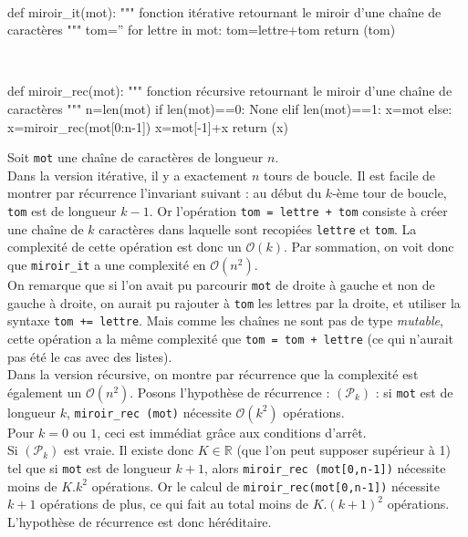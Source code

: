 \begin{corrige}
\question\ 
\begin{python}
def miroir_it(mot):
    """ fonction itérative retournant 
    le miroir d'une chaîne de caractères """
    tom=''
    for lettre in mot:
        tom=lettre+tom
    return (tom)
\end{python}

\question\ 
\begin{python}
def miroir_rec(mot):
    """ fonction récursive retournant 
    le miroir d'une chaîne de caractères """
    n=len(mot)
    if len(mot)==0:
        None
    elif len(mot)==1:
        x=mot
    else:
        x=miroir_rec(mot[0:n-1])
        x=mot[-1]+x
    return (x)
\end{python}

\setcounter{question}{3}
\question
Soit \texttt{mot} une chaîne de caractères de longueur $n$.\\
Dans la version itérative, il y a exactement $n$ tours de boucle. Il est facile de montrer par récurrence 
l'invariant suivant : au début du $k$-ème tour de boucle, \texttt{tom} est de longueur $k-1$. Or l'opération 
\texttt{tom = lettre + tom} consiste à créer une chaîne de $k$ caractères dans laquelle sont recopiées \texttt{lettre} 
et \texttt{tom}. La complexité de cette opération est donc un $\mathcal O(k)$. Par sommation, on voit donc que 
\texttt{miroir\_it} a une complexité en $\mathcal O(n^2)$.\\
On remarque que si l'on avait pu parcourir \texttt{mot} de droite à gauche et non de gauche à droite, on aurait pu 
rajouter à \texttt{tom} les lettres par la droite, et utiliser la syntaxe \texttt{tom += lettre}. Mais comme les 
chaînes ne sont pas de type \textit{mutable}, cette opération a la même complexité que \texttt{tom = tom + lettre} (ce 
qui n'aurait pas été le cas avec des listes).\\
Dans la version récursive, on montre par récurrence que la complexité est également un $\mathcal O(n^2)$. Posons 
l'hypothèse de 
récurrence : $(\mathcal P _k)$ : si \texttt{mot} est de longueur $k$, \texttt{miroir\_rec (mot)} nécessite $\mathcal 
O(k^2)$ 
opérations.\\
Pour $k=0$ ou $1$, ceci est immédiat grâce aux conditions d'arrêt.\\
Si $(\mathcal P _k)$ est vraie. Il existe donc $K\in\mathbb R$ (que l'on peut supposer supérieur à 1) tel que si 
\texttt{mot} est de longueur $k+1$, alors \texttt{miroir\_rec (mot[0,n-1])} nécessite moins de $K.k^2$ opérations. Or le 
calcul de \texttt{miroir\_rec(mot[0,n-1])} nécessite $k+1$ opérations de plus, ce qui fait au total moins de 
$K.(k+1)^2$ opérations. L'hypothèse de récurrence est donc héréditaire.

\setcounter{question}{0}
\end{corrige}

